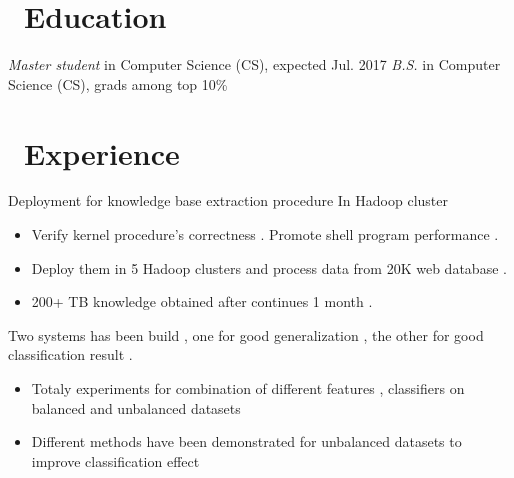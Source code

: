 \documentclass{resume}
\begin{document}



\section{\faGraduationCap\ Education}
\textit{Master student} in Computer Science (CS), expected Jul. 2017
\textit{B.S.} in Computer Science (CS), grads among top 10\%

\section{\faUsers\ Experience}
Deployment for knowledge base extraction procedure In Hadoop cluster
\begin{itemize}
  \item Verify kernel procedure's  correctness . Promote shell program performance .
  \item Deploy them in 5 Hadoop clusters and process data from 20K web database .
  \item 200+ TB knowledge obtained after continues 1 month .
\end{itemize}

Two systems has been build , one for good generalization , the other for good classification result .
\begin{itemize}
  \item Totaly experiments for combination of different features , classifiers on balanced and unbalanced datasets
  \item Different methods have been demonstrated for unbalanced datasets to improve classification effect
\end{itemize}
\end{document}
